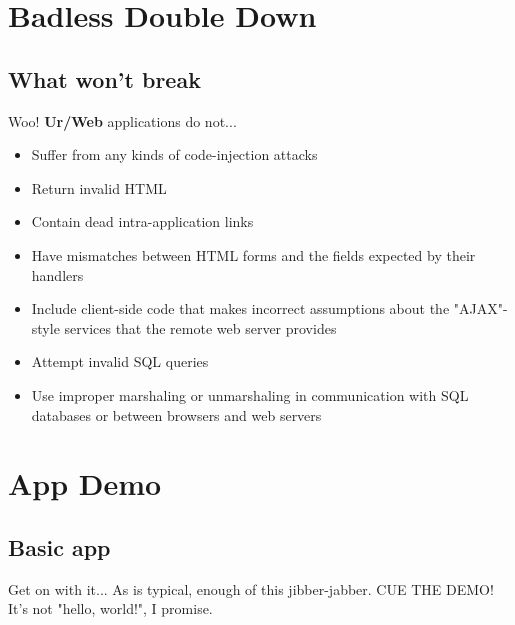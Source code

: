 \documentclass{beamer}
\begin{document}
\section{Badless Double Down}
\subsection{What won't break}
\begin{frame}{Woo!}
\textbf{Ur/Web} applications do not...

\begin{itemize}
\item Suffer from any kinds of code-injection attacks
\item Return invalid HTML
\item Contain dead intra-application links
\item Have mismatches between HTML forms and the fields expected by their handlers
\item Include client-side code that makes incorrect assumptions about the "AJAX"-style services that the remote web server provides
\item Attempt invalid SQL queries
\item Use improper marshaling or unmarshaling in communication with SQL databases or between browsers and web servers
\end{itemize}
\end{frame}


\section{App Demo}
\subsection{Basic app}
\begin{frame}{Get on with it...}
As is typical, enough of this jibber-jabber.
\vspace{\baselineskip}
\vspace{\baselineskip}
CUE THE DEMO!
\vspace{\baselineskip}
\vspace{\baselineskip}
It's not "hello, world!", I promise.
\end{frame}
\end{document}
